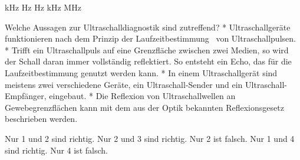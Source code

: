 \documentclass[11pt]{exam}
\begin{document}
\begin{questions}
\begin{choices}
	 kHz
	 Hz
	 Hz
	 kHz
	 MHz
\end{choices}

\vspace{3mm}\question Welche Aussagen zur Ultraschalldiagnostik sind zutreffend?	* Ultraschallgeräte funktionieren nach dem Prinzip der Laufzeitbestimmung  von Ultraschallpulsen.	* Trifft ein Ultraschallpuls auf eine Grenzfläche zwischen zwei Medien, so wird der Schall daran immer vollständig reflektiert. So entsteht ein Echo, das für die Laufzeitbestimmung genutzt werden kann.	* In einem Ultraschallgerät sind meistens zwei verschiedene Geräte, ein Ultraschall-Sender und ein Ultraschall-Empfänger, eingebaut.	* Die Reflexion von Ultraschallwellen an Gewebegrenzflächen kann mit dem aus der Optik bekannten Reflexionsgesetz beschrieben werden.

\begin{choices}
	\choice Nur 1 und 2 sind richtig.
	\choice Nur 2 und 3 sind richtig.
	\choice Nur 2 ist falsch.
	\choice Nur 1 und 4 sind richtig.
	\choice Nur 4 ist falsch.
\end{choices}

\vspace{3mm}\end{questions}
\end{document}

